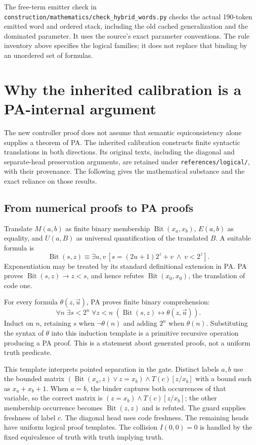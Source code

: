 \documentclass[11pt,letterpaper]{article}
\newcommand{\file}[1]{\texttt{\nolinkurl{#1}}}
\begin{document}
The free-term emitter check in
\file{construction/mathematics/check_hybrid_words.py} checks the actual
190-token emitted word and ordered stack, including the old cached
generalization and the dominated parameter. It uses the source's exact
parameter conventions. The rule inventory above specifies the logical
families; it does not replace that binding by an unordered set of formulas.



\section{Why the inherited calibration is a PA-internal argument}
\label{sec:calibration}

The new controller proof does not assume that semantic equiconsistency
alone supplies a theorem of PA. The inherited calibration constructs
finite syntactic translations in both directions. Its original texts,
including the diagonal and separate-head preservation arguments, are
retained under \file{references/logical/}, with their provenance. The
following gives the mathematical substance and the exact reliance on
those results.

\subsection{From numerical proofs to PA proofs}

Translate $M(a,b)$ as finite binary membership
$\operatorname{Bit}(x_a,x_b)$, $E(a,b)$ as equality, and $U(a,B)$ as
universal quantification of the translated $B$. A suitable formula is
\[
 \operatorname{Bit}(s,z)\equiv
 \exists u,v\,[s=(2u+1)2^z+v\ \wedge\ v<2^z].
\]
Exponentiation may be treated by its standard definitional extension in
PA. PA proves $\operatorname{Bit}(s,z)\to z<s$, and hence refutes
$\operatorname{Bit}(x_0,x_0)$, the translation of code one.

For every formula $\theta(z,\vec u)$, PA proves finite binary comprehension:
\[
 \forall n\;\exists s<2^n\;\forall z<n\;
    (\operatorname{Bit}(s,z)\leftrightarrow\theta(z,\vec u)).
\]
Induct on $n$, retaining $s$ when $\neg\theta(n)$ and adding $2^n$ when
$\theta(n)$. Substituting the syntax of $\theta$ into this induction
template is a primitive recursive operation producing a PA proof.
This is a statement about generated proofs, not a uniform truth predicate.

This template interprets pointed separation in the gate. Distinct labels
$a,b$ use the bounded matrix
$(\operatorname{Bit}(x_a,z)\lor z=x_b)\wedge T(c)[z/x_b]$ with a
bound such as $x_a+x_b+1$. When $a=b$, the binder captures both occurrences
of that variable, so the correct matrix is
$(z=x_b)\wedge T(c)[z/x_b]$; the other membership occurrence becomes
$\operatorname{Bit}(z,z)$ and is refuted. The guard supplies freshness
of label $c$. The diagonal head uses code freshness. The remaining heads
have uniform logical proof templates. The collision $I(0,0)=0$ is
handled by the fixed equivalence of truth with truth implying truth.
\end{document}

